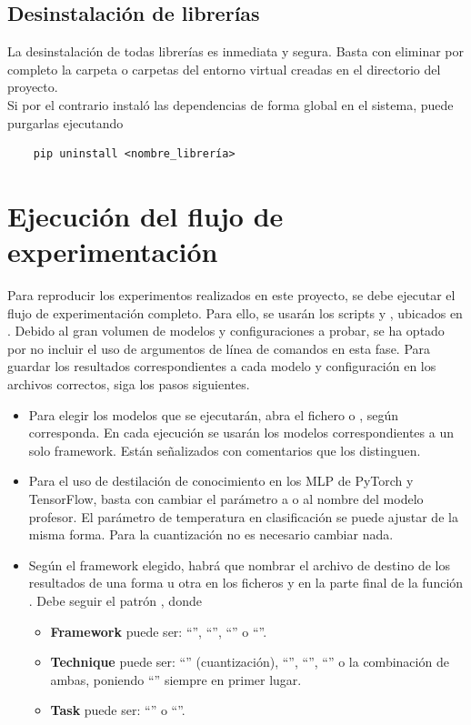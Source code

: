 \documentclass[a4paper,12pt,twoside,final]{book}
\begin{document}
\subsection{Desinstalación de librerías}
La desinstalación de todas librerías es inmediata y segura. Basta con eliminar por completo la carpeta o carpetas del
entorno virtual creadas en el directorio del proyecto.\\

Si por el contrario instaló las dependencias de forma global en el sistema, puede purgarlas ejecutando
\begin{verbatim}
    pip uninstall <nombre_librería>
\end{verbatim}

\section{Ejecución del flujo de experimentación}
Para reproducir los experimentos realizados en este proyecto, se debe ejecutar el flujo de experimentación completo.
Para ello, se usarán los scripts  y , ubicados en
. Debido al gran volumen de modelos y configuraciones a probar, se ha optado por no incluir el
uso de argumentos de línea de comandos en esta fase. Para guardar los resultados correspondientes a cada modelo y
configuración en los archivos correctos, siga los pasos siguientes.
\begin{itemize}
    \item Para elegir los modelos que se ejecutarán, abra el fichero  o
    , según corresponda. En cada ejecución se usarán los modelos correspondientes a un solo
    framework. Están señalizados con comentarios que los distinguen.
    \item Para el uso de destilación de conocimiento en los MLP de PyTorch y TensorFlow, basta con cambiar el parámetro
     a  o al nombre del modelo profesor. El parámetro de temperatura en clasificación
    se puede ajustar de la misma forma. Para la cuantización no es necesario cambiar nada.
    \item Según el framework elegido, habrá que nombrar el archivo de destino de los resultados de una forma u otra
    en los ficheros  y  en la parte final de la función
    . Debe seguir el patrón , donde
    \begin{itemize}
        \item \textbf{Framework} puede ser: ``'', ``'', ``'' o ``''.
        \item \textbf{Technique} puede ser: ``'' (cuantización), ``'', ``'',
        ``'' o la combinación de ambas, poniendo ``'' siempre en primer lugar.
        \item \textbf{Task} puede ser: ``'' o ``''.
    \end{itemize}
\end{itemize}
\end{document}
